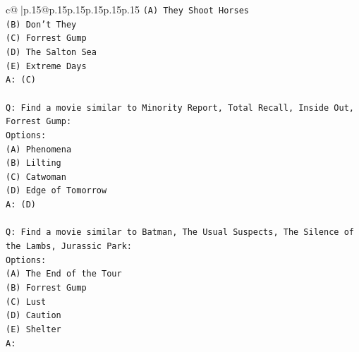 \documentclass{article}
\begin{document}
{\begin{supertabular}{c@{$\;$}|p{.15\linewidth}@{}p{.15\linewidth}p{.15\linewidth}p{.15\linewidth}p{.15\linewidth}p{.15\linewidth}}
{{{\texttt{(A) They Shoot Horses} \\
\texttt{(B) Don't They} \\
\texttt{(C) Forrest Gump} \\
\texttt{(D) The Salton Sea} \\
\texttt{(E) Extreme Days} \\
\texttt{A: (C)} \\
\\ 
\texttt{Q: Find a movie similar to Minority Report, Total Recall, Inside Out, Forrest Gump:} \\
\texttt{Options:} \\
\texttt{(A) Phenomena} \\
\texttt{(B) Lilting} \\
\texttt{(C) Catwoman} \\
\texttt{(D) Edge of Tomorrow} \\
\texttt{A: (D)} \\
\\ 
\texttt{Q: Find a movie similar to Batman, The Usual Suspects, The Silence of the Lambs, Jurassic Park:} \\
\texttt{Options:} \\
\texttt{(A) The End of the Tour} \\
\texttt{(B) Forrest Gump} \\
\texttt{(C) Lust} \\
\texttt{(D) Caution} \\
\texttt{(E) Shelter} \\
\texttt{A:} \\
            }
        }
    }
     \\ \\


\end{supertabular}}
\end{document}
